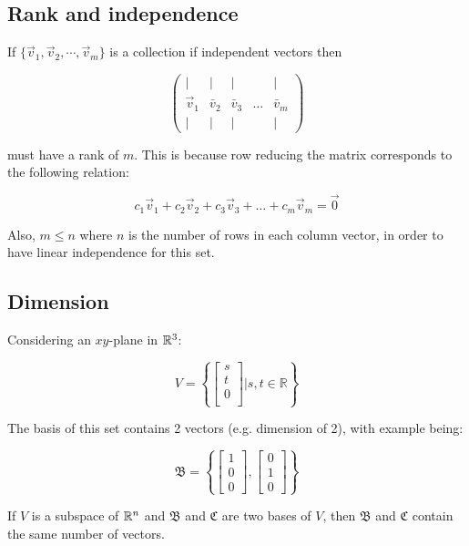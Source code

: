 \subsection{Rank and independence}

If $\{\vec{v}_1,\vec{v}_2,\cdots ,\vec{v}_m\}$ is a collection if independent vectors then

\[
\left(\begin{array}{ccccc}
\mid & \mid & \mid & & \mid \\
\vec{v}_{1} & \bar{v}_{2} & \bar{v}_{3} & \ldots & \bar{v}_{m} \\
\mid & \mid & \mid & & \mid
\end{array}\right)
\]

must have a rank of $m$. This is because row reducing the matrix corresponds to the following relation:

\[c_1\vec{v}_1+c_2\vec{v}_2+c_3\vec{v}_3+\dots +c_m\vec{v}_m=\vec{0}\]

\noindent
Also, $m\leq n$ where $n$ is the number of rows in each column vector, in order to have linear independence for this set.

\subsection{Dimension}

Considering an $xy$-plane in $\mathbb{R}^3$:

\[V=\left\{\begin{bmatrix}s\\t\\0\\ \end{bmatrix}\Bigg| s,t \in \mathbb{R} \right\}\]

The basis of this set contains 2 vectors (e.g. dimension of 2), with example being:

\[\mathfrak{B}=\left\{\begin{bmatrix}1\\0\\0 \end{bmatrix} , \begin{bmatrix} 0\\1\\0 \end{bmatrix} \right\}\]

\begin{framed}
    If $V$ is a subspace of $\mathbb{R}^n$ and $\mathfrak{B}$ and $\mathfrak{C}$ are two bases of $V$, then
    $\mathfrak{B}$ and $\mathfrak{C}$ contain the same number of vectors.
\end{framed}

